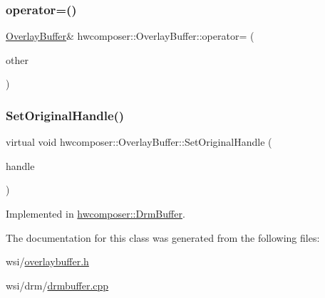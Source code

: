 \subsubsection{\texorpdfstring{operator=()}{operator=()}}
{\footnotesize\ttfamily \mbox{\hyperlink{classhwcomposer_1_1OverlayBuffer}{Overlay\+Buffer}}\& hwcomposer\+::\+Overlay\+Buffer\+::operator= (\begin{DoxyParamCaption}\item[{\mbox{\hyperlink{classhwcomposer_1_1OverlayBuffer}{Overlay\+Buffer}} \&\&}]{other }\end{DoxyParamCaption})\hspace{0.3cm}{\ttfamily [default]}}

\mbox{\label{classhwcomposer_1_1OverlayBuffer_a458dd8327bacb7a6560ac539e76ae408}} 
\subsubsection{\texorpdfstring{Set\+Original\+Handle()}{SetOriginalHandle()}}
{\footnotesize\ttfamily virtual void hwcomposer\+::\+Overlay\+Buffer\+::\+Set\+Original\+Handle (\begin{DoxyParamCaption}\item[{\mbox{\hyperlink{alios_2platformdefines_8h_ac0a2eaf260f556d17fe489911f017bdf}{H\+W\+C\+Native\+Handle}}}]{handle }\end{DoxyParamCaption})\hspace{0.3cm}{\ttfamily [pure virtual]}}



Implemented in \mbox{\hyperlink{classhwcomposer_1_1DrmBuffer_a2d7dbadddf5cce8260aa224af1b495c1}{hwcomposer\+::\+Drm\+Buffer}}.



The documentation for this class was generated from the following files\+:\begin{DoxyCompactItemize}
\item 
wsi/\mbox{\hyperlink{overlaybuffer_8h}{overlaybuffer.\+h}}\item 
wsi/drm/\mbox{\hyperlink{drmbuffer_8cpp}{drmbuffer.\+cpp}}\end{DoxyCompactItemize}
